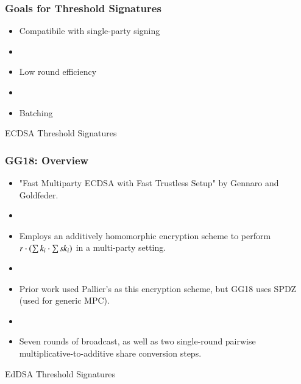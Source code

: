 \documentclass[hyperref={pdfpagelabels=true},table,dvipsnames,14pt,aspectratio=169]{beamer}
\begin{document}
\begin{frame}
  \frametitle{Goals for Threshold Signatures }

  \begin{itemize}
    \item<1-> Compatibile with single-party signing 
    \item[]
    \item<2-> Low round efficiency 
    \item[]
    \item<3-> Batching  
  \end{itemize}

\end{frame}

\begin{frame}
  \huge 
  ECDSA Threshold Signatures
\end{frame}


\begin{frame}
  \frametitle{GG18: Overview}

  \begin{itemize}
    \item<1-> "Fast Multiparty ECDSA with Fast Trustless Setup" by Gennaro and Goldfeder. 
    \item[]
    \item<2-> Employs an additively homomorphic encryption scheme to perform $r \cdot (\sum k_i  \cdot \sum \mathit{sk}_i) $ in a multi-party setting. 
    \item[]
    \item<3-> Prior work used Pallier's as this encryption scheme, but GG18 uses SPDZ (used for generic MPC). 
    \item[]
    \item<4-> Seven rounds of broadcast, as well as two single-round pairwise multiplicative-to-additive share conversion steps. 
  \end{itemize}
\end{frame}

\begin{frame}
  \huge 
  EdDSA Threshold Signatures
\end{frame}
\end{document}
